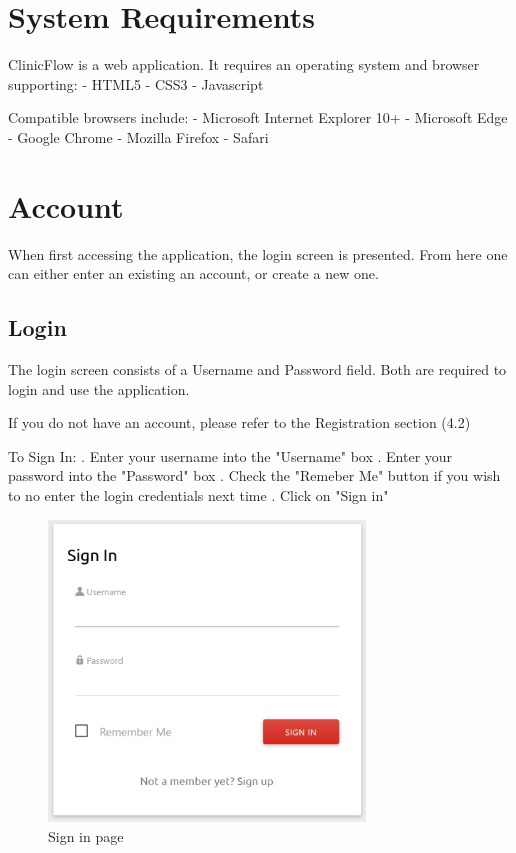 \documentclass[12pt]{article}
\begin{document}
\section{System Requirements}
ClinicFlow is a web application. It requires an operating system and browser supporting:
\newline
- HTML5
\medbreak
- CSS3
\medbreak
- Javascript
\medbreak

Compatible browsers include:
\medbreak
- Microsoft Internet Explorer 10+
\medbreak
- Microsoft Edge
\medbreak
- Google Chrome
\medbreak
- Mozilla Firefox
\medbreak
- Safari

\section{Account}
When first accessing the application, the login screen is presented. From here one can either enter an existing an account, or create a new one.

\subsection{Login}
The login screen consists of a Username and Password field. Both are required to login and use the application.
\medbreak

If you do not have an account, please refer to the Registration section (4.2)
\medbreak

To Sign In:
. Enter your username into the "Username" box
. Enter your password into the "Password" box
. Check the "Remeber Me" button if you wish to no enter the login credentials next time
. Click on "Sign in"

\begin{figure}[h]
\caption{Sign in page}
\centering
\includegraphics[width=0.75\textwidth]{signin}
\end{figure}
\end{document}
